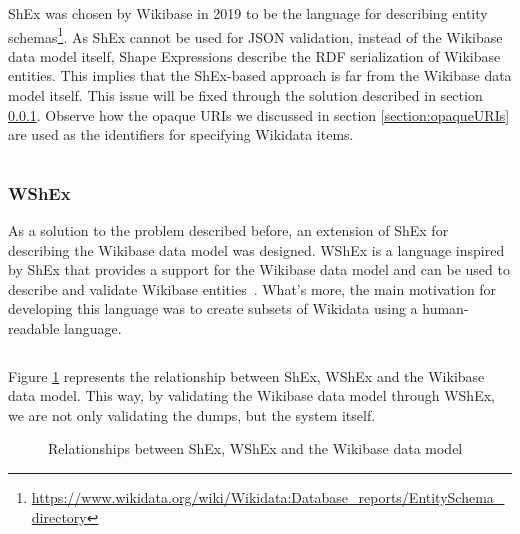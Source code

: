 ShEx was chosen by Wikibase in 2019 to be the language for describing entity schemas\footnote{\url{https://www.wikidata.org/wiki/Wikidata:Database_reports/EntitySchema_directory}}. As ShEx cannot be used for JSON validation, instead of the Wikibase data model itself, Shape Expressions describe the RDF serialization of Wikibase entities. This implies that the ShEx-based approach is far from the Wikibase data model itself. This issue will be fixed through the solution described in section \ref{section:WShEx}. Observe how the opaque URIs we discussed in section \ref{section:opaqueURIs} are used as the identifiers for specifying Wikidata items.

\begin{code}
    \inputminted{shex}{code/listings/6-5_wikibase.shex}
\end{code}

\subsubsection{WShEx}
\label{section:WShEx}

As a solution to the problem described before, an extension of ShEx for describing the Wikibase data model was designed. WShEx is a language inspired by ShEx that provides a support for the Wikibase data model and can be used to describe and validate Wikibase entities~\cite{https://doi.org/10.48550/arxiv.2208.02697}. What's more, the main motivation for developing this language was to create subsets of Wikidata using a human-readable language.

\begin{code}
    \inputminted{shex}{code/listings/6-6_wshex.shex}
\end{code}

Figure \ref{fig:WShEx} represents the relationship between ShEx, WShEx and the Wikibase data model. This way, by validating the Wikibase data model through WShEx, we are not only validating the dumps, but the system itself.

\begin{figure}[ht]
    \centering
    
    \caption[Relationships between ShEx, WShEx and the Wikibase data model]{Relationships between ShEx, WShEx and the Wikibase data model~\cite{https://doi.org/10.48550/arxiv.2110.11709}}
    \label{fig:WShEx}
\end{figure}

